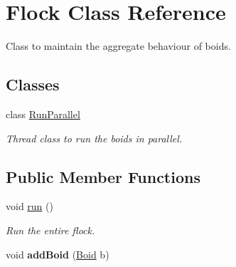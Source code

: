 \hypertarget{class_flock}{}\section{Flock Class Reference}
\label{class_flock}


Class to maintain the aggregate behaviour of boids.  


\subsection*{Classes}
\begin{DoxyCompactItemize}
\item 
class \mbox{\hyperlink{class_flock_1_1_run_parallel}{Run\+Parallel}}
\begin{DoxyCompactList}\small\item\em Thread class to run the boids in parallel. \end{DoxyCompactList}\end{DoxyCompactItemize}
\subsection*{Public Member Functions}
\begin{DoxyCompactItemize}
\item 
void \mbox{\hyperlink{class_flock_ab97db256aa850e22758daba7874ec611}{run}} ()
\begin{DoxyCompactList}\small\item\em Run the entire flock. \end{DoxyCompactList}\item 
\mbox{\label{class_flock_aa290cce57c36e9e7c1c4f2c3695fb896}} 
void {\bfseries add\+Boid} (\mbox{\hyperlink{class_boid}{Boid}} b)
\end{DoxyCompactItemize}
